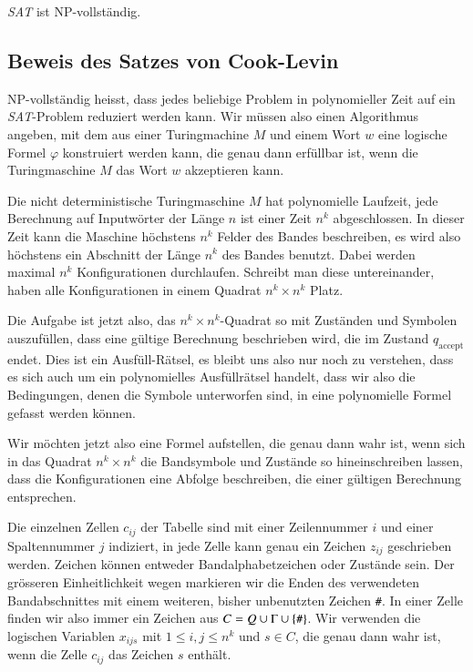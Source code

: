 \begin{satz}
\label{cooklevin}
\textsl{SAT} ist NP-vollständig.
\end{satz}




\subsection{Beweis des Satzes von Cook-Levin}

NP-vollständig heisst, dass jedes beliebige Problem in polynomieller
Zeit auf ein \textsl{SAT}-Problem reduziert werden kann.
Wir müssen
also einen Algorithmus angeben, mit dem aus einer Turingmachine
$M$ und einem Wort $w$
eine logische Formel $\varphi$ konstruiert werden kann, die genau
dann erfüllbar ist, wenn die Turingmaschine $M$ das Wort $w$
akzeptieren kann.

Die nicht deterministische Turingmaschine $M$ hat polynomielle Laufzeit,
jede Berechnung auf Inputwörter der Länge $n$ ist einer Zeit $n^k$
abgeschlossen. In dieser Zeit kann die Maschine höchstens $n^k$ Felder
des Bandes beschreiben, es wird also höchstens ein Abschnitt der
Länge $n^k$ des Bandes benutzt. Dabei werden maximal $n^k$
Konfigurationen durchlaufen. Schreibt man diese untereinander,
haben alle Konfigurationen in einem Quadrat $n^k\times n^k$
Platz.

Die Aufgabe ist jetzt also, das $n^k \times n^k$-Quadrat so mit Zuständen
und Symbolen auszufüllen, dass eine gültige Berechnung beschrieben wird,
die im Zustand $q_{\text{accept}}$ endet.
Dies ist ein Ausfüll-Rätsel, es bleibt uns also nur noch zu verstehen,
dass es sich auch um ein polynomielles Ausfüllrätsel handelt,
dass wir also die Bedingungen, denen die Symbole unterworfen sind,
in eine polynomielle Formel gefasst werden können.

Wir möchten jetzt also eine Formel aufstellen, die genau dann wahr
ist, wenn sich in das Quadrat $n^k\times n^k$ die Bandsymbole und
Zustände so hineinschreiben lassen, dass die Konfigurationen eine
Abfolge beschreiben, die einer gültigen Berechnung entsprechen.

Die einzelnen Zellen $c_{ij}$ der Tabelle sind mit einer Zeilennummer $i$
und einer Spaltennummer $j$ indiziert, in jede Zelle kann
genau ein Zeichen $z_{ij}$ geschrieben werden.
Zeichen können entweder Bandalphabetzeichen oder Zustände sein.
Der grösseren Einheitlichkeit wegen markieren wir die Enden des verwendeten
Bandabschnittes mit einem weiteren, bisher unbenutzten Zeichen {\tt\#}.
In einer Zelle finden wir also immer ein Zeichen aus $C=Q\cup \Gamma\cup\{\text{\tt\#}\}$.
Wir verwenden die logischen
Variablen $x_{ijs}$ mit $1\le i,j\le n^k$ und $s\in C$, die
genau dann wahr ist, wenn die Zelle $c_{ij}$ das Zeichen $s$ enthält.

